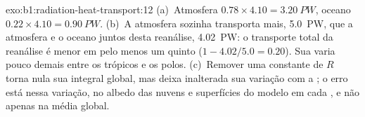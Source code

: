 \begin{solution}{exo:b1:radiation-heat-transport:12}
(a)~Atmosfera $0.78 \times 4.10 = \qty{3.20}{PW}$, oceano $0.22 \times 4.10 =
\qty{0.90}{PW}$. (b)~A atmosfera sozinha transporta mais, \qty{5.0}{PW}, que a atmosfera e o oceano
juntos desta reanálise, \qty{4.02}{PW}: o transporte total da reanálise é menor em pelo menos um
quinto ($1 - 4.02/5.0 = 0.20$). Sua  varia pouco demais entre os trópicos e os polos.
(c)~Remover uma constante de $R$ torna nula sua integral global, mas deixa inalterada sua variação
com a ; o erro está nessa variação, no albedo das nuvens e superfícies do modelo em cada
, e não apenas na média global.
\end{solution}

